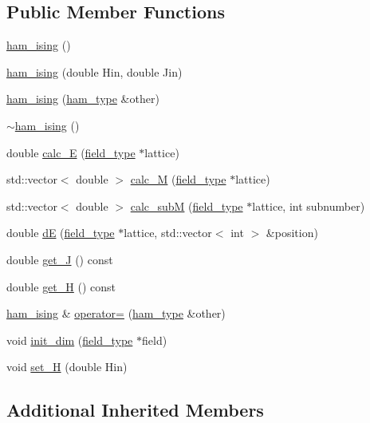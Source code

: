 \subsection*{Public Member Functions}
\begin{DoxyCompactItemize}
\item 
\hyperlink{classham__ising_a7d8f84c23bfdc73ff1ae9802f301b4ac}{ham\+\_\+ising} ()
\item 
\hyperlink{classham__ising_a78b0da58aa8aa9d45a34cbcab0758321}{ham\+\_\+ising} (double Hin, double Jin)
\item 
\hyperlink{classham__ising_a89452c56f4810fbd26807be64936048a}{ham\+\_\+ising} (\hyperlink{classham__type}{ham\+\_\+type} \&other)
\item 
\hyperlink{classham__ising_ab8232cf72719703d5392e960f24996f0}{$\sim$ham\+\_\+ising} ()
\item 
double \hyperlink{classham__ising_a04bdf2c223bada94ca813bc71d71e7cb}{calc\+\_\+E} (\hyperlink{classfield__type}{field\+\_\+type} $\ast$lattice)
\item 
std\+::vector$<$ double $>$ \hyperlink{classham__ising_ad530e522cb6a2a80d10948603ff667ff}{calc\+\_\+M} (\hyperlink{classfield__type}{field\+\_\+type} $\ast$lattice)
\item 
std\+::vector$<$ double $>$ \hyperlink{classham__ising_a7092d807838fed1640bb03fa22e71236}{calc\+\_\+subM} (\hyperlink{classfield__type}{field\+\_\+type} $\ast$lattice, int subnumber)
\item 
double \hyperlink{classham__ising_ae83e5c08a8da4652440ccd5d40554421}{dE} (\hyperlink{classfield__type}{field\+\_\+type} $\ast$lattice, std\+::vector$<$ int $>$ \&position)
\item 
double \hyperlink{classham__ising_a3d5b100c6f3a1f750c524a2d302fd65e}{get\+\_\+J} () const 
\item 
double \hyperlink{classham__ising_aa03103158f5db829b8f17f43978a816c}{get\+\_\+H} () const 
\item 
\hyperlink{classham__ising}{ham\+\_\+ising} \& \hyperlink{classham__ising_a19a91ce13ee2834f11aea703b335a1da}{operator=} (\hyperlink{classham__type}{ham\+\_\+type} \&other)
\item 
void \hyperlink{classham__ising_a92139385ee5cd3eab8a03897245dc53f}{init\+\_\+dim} (\hyperlink{classfield__type}{field\+\_\+type} $\ast$field)
\item 
void \hyperlink{classham__ising_a4b0bdb0e5576905061ec607cbeeb76cb}{set\+\_\+H} (double Hin)
\end{DoxyCompactItemize}
\subsection*{Additional Inherited Members}


